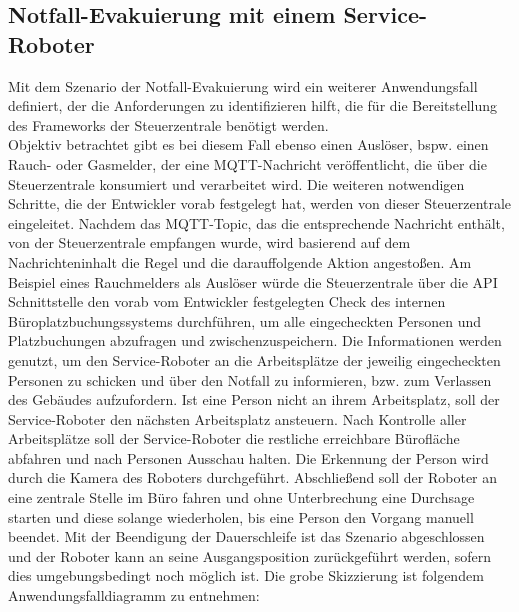 \subsection{Notfall-Evakuierung mit einem Service-Roboter}
\label{subsec:evacuation}
    Mit dem Szenario der Notfall-Evakuierung wird ein weiterer Anwendungsfall definiert, der die 
    Anforderungen zu identifizieren hilft, die für die Bereitstellung des Frameworks der Steuerzentrale benötigt werden. 
    \\
    \linebreak
    Objektiv betrachtet gibt es bei diesem Fall ebenso einen Auslöser, bspw. einen Rauch- 
    oder Gasmelder, der eine \acs{MQTT}-Nachricht veröffentlicht, die über die Steuerzentrale konsumiert und verarbeitet wird. Die 
    weiteren notwendigen Schritte, die der Entwickler vorab festgelegt hat, werden von dieser Steuerzentrale eingeleitet. 
    Nachdem das \acs{MQTT}-Topic, das die entsprechende Nachricht enthält, von der Steuerzentrale empfangen wurde, wird 
    basierend auf dem Nachrichteninhalt die Regel und die darauffolgende Aktion angestoßen. Am Beispiel eines Rauchmelders 
    als Auslöser würde die Steuerzentrale über die \acs{API} 
    Schnittstelle den vorab vom Entwickler festgelegten Check des internen Büroplatzbuchungssystems durchführen, um alle 
    eingecheckten Personen und Platzbuchungen abzufragen und 
    zwischenzuspeichern. Die Informationen werden genutzt, um den Service-Roboter an die Arbeitsplätze der jeweilig 
    eingecheckten Personen zu schicken und über den Notfall zu informieren, bzw. zum Verlassen des Gebäudes aufzufordern. 
    Ist eine Person nicht an ihrem Arbeitsplatz, soll der Service-Roboter den nächsten Arbeitsplatz ansteuern. Nach Kontrolle aller 
    Arbeitsplätze soll der Service-Roboter die restliche erreichbare Bürofläche abfahren und nach Personen 
    Ausschau halten. Die Erkennung der Person wird durch die Kamera des Roboters durchgeführt. Abschließend soll der Roboter 
    an eine zentrale Stelle im Büro fahren und ohne Unterbrechung eine 
    Durchsage starten und diese solange wiederholen, bis eine Person den Vorgang manuell beendet. Mit der Beendigung der Dauerschleife 
    ist das Szenario abgeschlossen und der Roboter kann an seine Ausgangsposition zurückgeführt werden, sofern dies 
    umgebungsbedingt noch möglich ist. Die grobe Skizzierung ist folgendem Anwendungsfalldiagramm zu entnehmen: 
